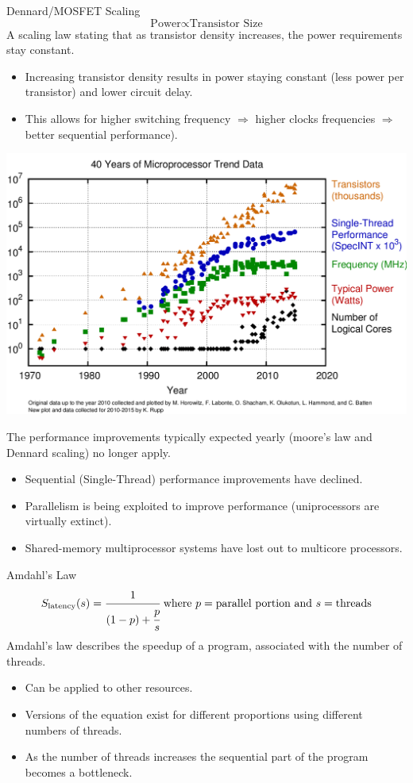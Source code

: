 \begin{definitionbox}{Dennard/MOSFET Scaling}
    \[\text{Power} \propto \text{Transistor Size}\]
    A scaling law stating that as transistor density increases, the power requirements stay constant. 
    \begin{itemize}
        \setlength\itemsep{0em}
        \item Increasing transistor density results in power staying constant (less power per transistor) and lower circuit delay. 
        \item This allows for higher switching frequency $\Rightarrow$ higher clocks frequencies $\Rightarrow$ better sequential performance).
    \end{itemize}
\end{definitionbox}

\begin{center}
    \includegraphics[width=.9\textwidth]{introduction/images/moores_law_graph.png}
\end{center}
The performance improvements typically expected yearly (moore's law and Dennard scaling) no longer apply.
\begin{itemize}
    \item Sequential (Single-Thread) performance improvements have declined.
    \item Parallelism is being exploited to improve performance (uniprocessors are virtually extinct).
    \item Shared-memory multiprocessor systems have lost out to multicore processors.
\end{itemize} 

\begin{definitionbox}{Amdahl's Law}
    \[S_{\text{latency}}(s) = \cfrac{1}{(1-p)+ \cfrac{p}{s}} \text{ where } p = \text{parallel portion} \text{ and } s = \text{threads}\]
    Amdahl's law describes the speedup of a program, associated with the number of threads.
    \begin{itemize}
        \item Can be applied to other resources.
        \item Versions of the equation exist for different proportions using different numbers of threads.
        \item As the number of threads increases the sequential part of the program becomes a bottleneck. 
    \end{itemize}
\end{definitionbox}

